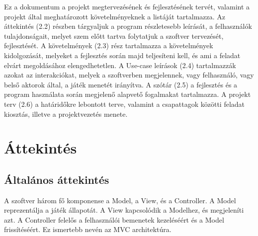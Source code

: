 Ez a dokumentum a projekt megtervezésének és fejlesztésének tervét, valamint a projekt által meghatározott követelményeknek a listáját tartalmazza.
Az áttekintés (2.2) részben tárgyaljuk a program részletesebb leírását, a felhasználók tulajdonságait, melyet szem előtt tartva folytatjuk a szoftver tervezését, fejlesztését.
A követelmények (2.3) rész tartalmazza a követelmények kidolgozását, melyeket a fejlesztés során majd teljesíteni kell, és ami a feladat elvárt megoldásához elengedhetetlen.
A Use-case leírások (2.4) tartalmazzák azokat az interakciókat, melyek a szoftverben megjelennek, vagy felhasználó, vagy belső aktorok által, a játék menetét irányítva.
A szótár (2.5) a fejlesztés és a program használata során megjelenő alapvető fogalmakat tartalmazza.
A projekt terv (2.6) a határidőkre lebontott terve, valamint a csapattagok közötti feladat kiosztás, illetve a projektvezetés menete.
\section{Áttekintés}
\subsection{Általános áttekintés}
A szoftver három fő komponense a Model, a View, és a Controller. A Model reprezentálja a játék állapotát. A View kapcsolódik a Modelhez, és megjeleníti azt. A Controller felelős a felhasználói bemenetek kezeléséért és a Model frissítéséért. Ez ismertebb nevén az MVC architektúra.

